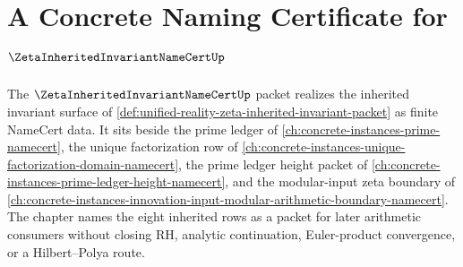 \chapter{A Concrete Naming Certificate for $\ZetaInheritedInvariantNameCertUp$}
\label{ch:concrete-instances-zeta-inherited-invariant-namecert}

The $\ZetaInheritedInvariantNameCertUp$ packet realizes the inherited invariant surface of \autoref{def:unified-reality-zeta-inherited-invariant-packet} as finite NameCert data. It sits beside the prime ledger of \autoref{ch:concrete-instances-prime-namecert}, the unique factorization row of \autoref{ch:concrete-instances-unique-factorization-domain-namecert}, the prime ledger height packet of \autoref{ch:concrete-instances-prime-ledger-height-namecert}, and the modular-input zeta boundary of \autoref{ch:concrete-instances-innovation-input-modular-arithmetic-boundary-namecert}. The chapter names the eight inherited rows as a packet for later arithmetic consumers without closing RH, analytic continuation, Euler-product convergence, or a Hilbert--Polya route.

